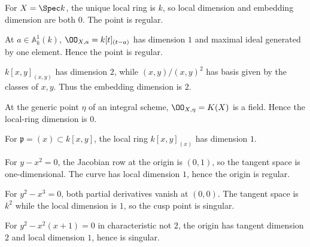 \begin{example}\label{ex:vi32-01}
For $X=\Spec k$, the unique local ring is $k$, so local dimension and embedding dimension are both $0$. The point is regular.
\end{example}

\begin{example}\label{ex:vi32-02}
At $a\in\mathbb A^1_k(k)$, $\OO_{X,a}=k[t]_{(t-a)}$ has dimension $1$ and maximal ideal generated by one element. Hence the point is regular.
\end{example}

\begin{example}\label{ex:vi32-03}
$k[x,y]_{(x,y)}$ has dimension $2$, while $(x,y)/(x,y)^2$ has basis given by the classes of $x,y$. Thus the embedding dimension is $2$.
\end{example}

\begin{example}\label{ex:vi32-04}
At the generic point $\eta$ of an integral scheme, $\OO_{X,\eta}=K(X)$ is a field. Hence the local-ring dimension is $0$.
\end{example}

\begin{example}\label{ex:vi32-05}
For $\mathfrak p=(x)\subset k[x,y]$, the local ring $k[x,y]_{(x)}$ has dimension $1$.
\end{example}

\begin{example}\label{ex:vi32-06}
For $y-x^2=0$, the Jacobian row at the origin is $(0,1)$, so the tangent space is one-dimensional. The curve has local dimension $1$, hence the origin is regular.
\end{example}

\begin{example}\label{ex:vi32-07}
For $y^2-x^3=0$, both partial derivatives vanish at $(0,0)$. The tangent space is $k^2$ while the local dimension is $1$, so the cusp point is singular.
\end{example}

\begin{example}\label{ex:vi32-08}
For $y^2-x^2(x+1)=0$ in characteristic not $2$, the origin has tangent dimension $2$ and local dimension $1$, hence is singular.
\end{example}

